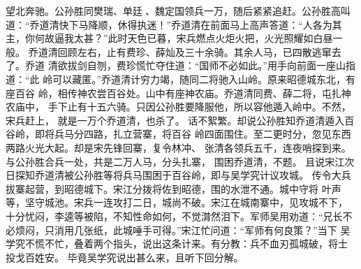 望北奔驰。公孙胜同樊瑞、单廷、魏定国领兵一万，随后紧紧追赶。公孙胜高叫
道：“乔道清快下马降顺，休得执迷！”乔道清在前面马上高声答道：“人各为其
主，你何故逼我太甚？”此时天色已暮，宋兵燃点火炬火把，火光照耀如白昼一般。
乔道清回顾左右，止有费珍、薛灿及三十余骑。其余人马，已四散逃窜去了。乔道
清欲拔剑自刎，费珍慌忙夺住道：“国师不必如此。”用手向前面一座山指道：“此
岭可以藏匿。”乔道清计穷力竭，随同二将驰入山岭。原来昭德城东北，有座百谷
岭，相传神农尝百谷处。山中有座神农庙。乔道清同费、薛二将，屯扎神农庙中，
手下止有十五六骑。只因公孙胜要降服他，所以容他遁入岭中。不然，宋兵赶上，
就是一万个乔道清，也杀了。
话不絮繁。却说公孙胜知乔道清遁入百谷岭，即将兵马分四路，扎立营寨，将百谷
岭四面围住。至二更时分，忽见东西两路火光大起。却是宋先锋回寨，复令林冲、
张清各领兵五千，连夜哨探到来。与公孙胜合兵一处，共是二万人马，分头扎寨，
围困乔道清，不题。
且说宋江次日探知乔道清被公孙胜等将兵马围困于百谷岭，即与吴学究计议攻城。
传令大兵拔寨起营，到昭德城下。宋江分拨将佐到昭德，围的水泄不通。城中守将
叶声等，坚守城池。宋兵一连攻打二日，城尚不破。宋江在城南寨中，见攻城不下，
十分忧闷，李逵等被陷，不知性命如何，不觉潸然泪下。军师吴用劝道：“兄长不
必烦闷，只消用几张纸，此城唾手可得。”宋江忙问道：“军师有何良策？”当下
吴学究不慌不忙，叠着两个指头，说出这条计来。有分教：兵不血刃孤城破，将士
投戈百姓安。
毕竟吴学究说出甚么来，且听下回分解。